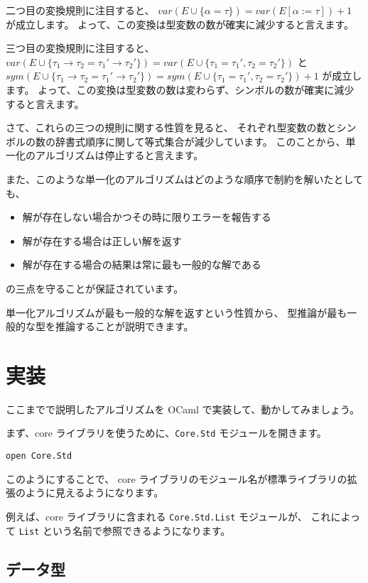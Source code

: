 二つ目の変換規則に注目すると、
$\mathit{var}(E \cup \{\alpha = \tau\}) = \mathit{var}(E[\alpha := \tau])+1$ が成立します。
よって、この変換は型変数の数が確実に減少すると言えます。

三つ目の変換規則に注目すると、
$\mathit{var}(E \cup \{\tau_1 \to \tau_2 = \tau_1' \to \tau_2'\}) =
 \mathit{var}(E \cup \{\tau_1 = \tau_1', \tau_2 = \tau_2'\})$
と
$\mathit{sym}(E \cup \{\tau_1 \to \tau_2 = \tau_1' \to \tau_2'\}) =
 \mathit{sym}(E \cup \{\tau_1 = \tau_1', \tau_2 = \tau_2'\})+1$
が成立します。
よって、この変換は型変数の数は変わらず、シンボルの数が確実に減少すると言えます。

さて、これらの三つの規則に関する性質を見ると、
それぞれ型変数の数とシンボルの数の辞書式順序に関して等式集合が減少しています。
このことから、単一化のアルゴリズムは停止すると言えます。

また、このような単一化のアルゴリズムはどのような順序で制約を解いたとしても、
\begin{itemize}
  \item 解が存在しない場合かつその時に限りエラーを報告する
  \item 解が存在する場合は正しい解を返す
  \item 解が存在する場合の結果は常に最も一般的な解である
\end{itemize}
の三点を守ることが保証されています。

単一化アルゴリズムが最も一般的な解を返すという性質から、
型推論が最も一般的な型を推論することが説明できます。

\section{実装}

ここまでで説明したアルゴリズムを OCaml で実装して、動かしてみましょう。

まず、core ライブラリを使うために、\texttt{Core.Std} モジュールを開きます。

\begin{lstlisting}
open Core.Std
\end{lstlisting}

このようにすることで、
core ライブラリのモジュール名が標準ライブラリの拡張のように見えるようになります。

例えば、core ライブラリに含まれる \texttt{Core.Std.List} モジュールが、
これによって \texttt{List} という名前で参照できるようになります。

\subsection{データ型}

